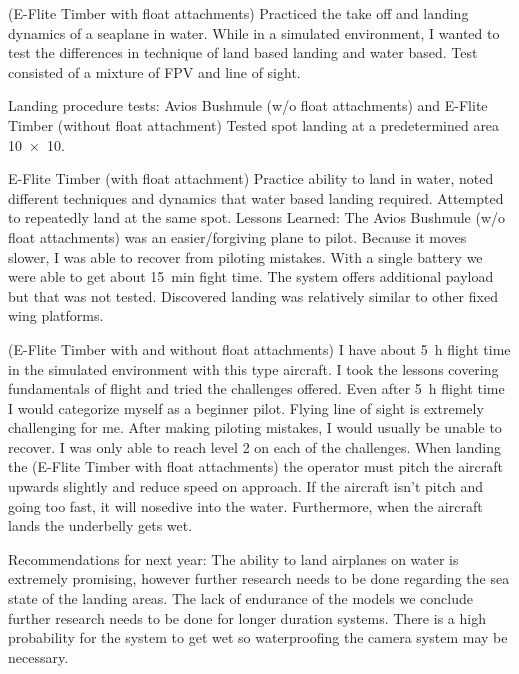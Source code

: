 (E-Flite Timber with float attachments) Practiced the take off and landing dynamics of a seaplane in water. While in a simulated environment, I wanted to test the differences in technique of land based landing and water based. Test consisted of a mixture of FPV and line of sight.

Landing procedure tests: Avios Bushmule (w/o float attachments) and E-Flite Timber (without float attachment) Tested spot landing at a predetermined area \SI{10x10}{\foot}.

E-Flite Timber (with float attachment) Practice ability to land in water, noted different techniques and dynamics that water based landing required. Attempted to repeatedly land at the same spot.  
Lessons Learned: The Avios Bushmule  (w/o float attachments) was an easier/forgiving plane to pilot. Because it moves slower, I was able to recover from piloting mistakes. With a single battery we were able to get about \SI{15}{\minute} fight time. The system offers additional payload but that was not tested. Discovered landing was relatively similar to other fixed wing platforms.

(E-Flite Timber with and without float attachments) I have about \SI{5}{\hour} flight time in the simulated environment with this type aircraft. I took the lessons covering fundamentals of flight and tried the challenges offered. Even after \SI{5}{\hour} flight time I would categorize myself as a beginner pilot. Flying line of sight is extremely challenging for me. After making piloting mistakes, I would usually be unable to recover. I was only able to reach level 2 on each of the challenges. When landing the (E-Flite Timber with float attachments) the operator must pitch the aircraft upwards slightly and reduce speed on approach. If the aircraft isn't pitch and going too fast, it will nosedive into the water. Furthermore, when the aircraft lands the underbelly gets wet.  

Recommendations for next year: The ability to land airplanes on water is extremely promising, however further research needs to be done regarding the sea state of the landing areas. The lack of endurance of the models we conclude further research needs to be done for longer duration systems. There is a high probability for the system to get wet so waterproofing the camera system may be necessary. 



